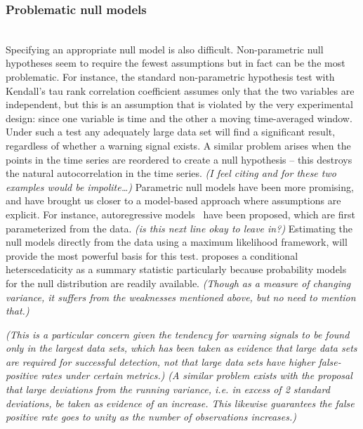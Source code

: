 \documentclass[authoryear,preprint,11pt]{elsarticle}
\newcommand{\cb}[1]{{\it \color{darkgreen} (#1)}}
\begin{document}
\subsubsection*{Problematic null models}\\
Specifying an appropriate null model is also difficult.  
Non-parametric null hypotheses seem to require the fewest assumptions but in fact can be the most problematic.  
For instance, the standard non-parametric hypothesis test with Kendall's tau rank correlation coefficient
assumes only that the two variables are independent, but this is
an assumption that is violated by the very experimental design:
since one variable is time and the other a moving time-averaged window.  
Under such a test any adequately large data set will find a significant result, regardless of whether a warning signal exists.
A similar problem arises when the points in the time series are reordered to create a null hypothesis -- 
this destroys the natural autocorrelation in the time series.  
\cb{I feel citing \citet{Dakos2011} and \citet{Dakos2008} for these two examples would be impolite\dots} 
Parametric null models have been more promising, and have brought us closer to a model-based approach where assumptions are explicit.  
For instance, autoregressive models~\citet{Dakos2008} have been proposed, which are first parameterized from the data.  
\cb{is this next line okay to leave in?}
Estimating the null models directly from the data using a maximum likelihood framework, will provide the most powerful basis for this test.  
\citet{Seekell2011} proposes a conditional heterscedaticity as a summary statistic particularly because probability models for the null distribution are readily available.\cb{Though as a measure of changing variance, it suffers from the weaknesses mentioned above, but no need to mention that.} 


\cb{This is a particular concern given the tendency for warning signals to be found only in the largest data sets, 
which has been taken as evidence that large data sets are required for successful detection,
not that large data sets have higher false-positive rates under certain metrics.}
\cb{A similar problem exists with the proposal that large deviations from the running variance,
i.e. in excess of 2 standard deviations, be taken as evidence of an increase.
This likewise guarantees the false positive rate goes to unity as the number of observations increases.}
\end{document}
